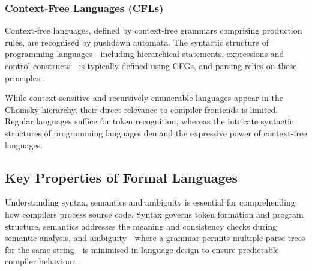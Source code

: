 \subsubsection*{Context‑Free Languages (CFLs)}
Context‑free languages, defined by context‑free grammars comprising production rules, are recognised by pushdown automata. The syntactic structure of programming languages—including hierarchical statements, expressions and control constructs—is typically defined using CFGs, and parsing relies on these principles \cite{kent-context-free-grammars-pda, aho2007compilers}.

While context‑sensitive and recursively enumerable languages appear in the Chomsky hierarchy, their direct relevance to compiler frontends is limited. Regular languages suffice for token recognition, whereas the intricate syntactic structures of programming languages demand the expressive power of context‑free languages.

\subsection{Key Properties of Formal Languages}

Understanding syntax, semantics and ambiguity is essential for comprehending how compilers process source code. Syntax governs token formation and program structure, semantics addresses the meaning and consistency checks during semantic analysis, and ambiguity—where a grammar permits multiple parse trees for the same string—is minimised in language design to ensure predictable compiler behaviour \cite{aho2007compilers}.


\pagebreak
